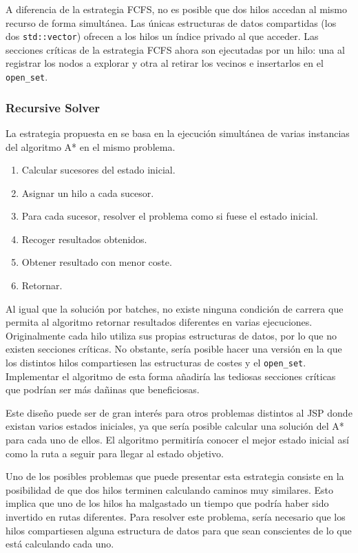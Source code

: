 A diferencia de la estrategia FCFS,
no es posible que dos hilos accedan al mismo recurso
de forma simultánea.
Las únicas estructuras de datos compartidas
(los dos \lstinline{std::vector})
ofrecen a los hilos un índice privado al que acceder.
Las secciones críticas de la estrategia FCFS
ahora son ejecutadas por un hilo:
una al registrar los nodos a explorar y
otra al retirar los vecinos e insertarlos en el \lstinline{open_set}.

\pagebreak
\subsubsection{Recursive Solver}

La estrategia propuesta en \cite{Zag17} se basa en la ejecución
simultánea de varias instancias del algoritmo A* en el mismo problema.
\begin{enumerate}[itemsep=0.25px]
    \item Calcular sucesores del estado inicial.
    \item Asignar un hilo a cada sucesor.
    \item Para cada sucesor, resolver el problema como si fuese el estado inicial.
    \item Recoger resultados obtenidos.
    \item Obtener resultado con menor coste.
    \item Retornar.
\end{enumerate}

Al igual que la solución por batches,
no existe ninguna condición de carrera que permita
al algoritmo retornar resultados diferentes
en varias ejecuciones.
Originalmente cada hilo utiliza sus propias estructuras
de datos, por lo que no existen secciones críticas.
No obstante, sería posible hacer una versión en la que
los distintos hilos compartiesen las estructuras de costes
y el \lstinline{open_set}.
Implementar el algoritmo de esta forma añadiría las
tediosas secciones críticas que podrían ser más
dañinas que beneficiosas.

Este diseño puede ser de gran interés para otros problemas
distintos al JSP donde existan varios estados iniciales,
ya que sería posible calcular una solución del A*
para cada uno de ellos.
El algoritmo permitiría conocer el mejor estado inicial
así como la ruta a seguir para llegar al estado objetivo.

Uno de los posibles problemas que puede presentar esta
estrategia consiste en la posibilidad de que dos hilos
terminen calculando caminos muy similares.
Esto implica que uno de los hilos ha malgastado un tiempo
que podría haber sido invertido en rutas diferentes.
Para resolver este problema, sería necesario que
los hilos compartiesen alguna estructura de datos
para que sean conscientes de lo que está calculando cada uno.

